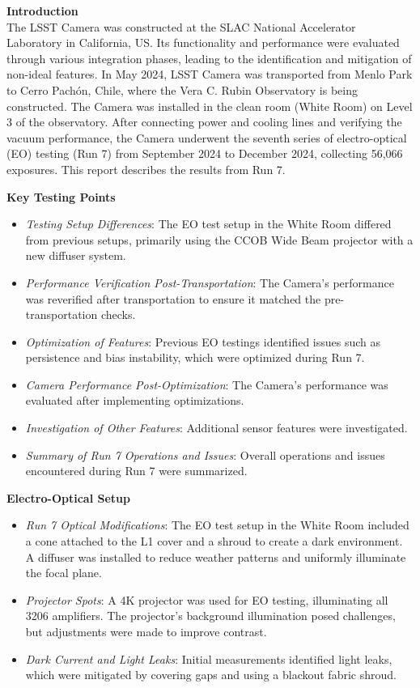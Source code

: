\textbf{Introduction} \\
The LSST Camera was constructed at the SLAC National Accelerator Laboratory in California, US. Its functionality and performance were evaluated through various integration phases, leading to the identification and mitigation of non-ideal features.
In May 2024, LSST Camera was transported from Menlo Park to Cerro Pachón, Chile, where the Vera C. Rubin Observatory is being constructed. The Camera was installed in the clean room (White Room) on Level 3 of the observatory. After connecting power and cooling lines and verifying the vacuum performance, the Camera underwent the seventh series of electro-optical (EO) testing (Run 7) from September 2024 to December 2024, collecting 56,066 exposures. This report describes the results from Run 7.

\textbf{Key Testing Points} \\
\begin{itemize}
    \item \textit{Testing Setup Differences}: The EO test setup in the White Room differed from previous setups, primarily using the CCOB Wide Beam projector with a new diffuser system.
    \item \textit{Performance Verification Post-Transportation}: The Camera's performance was reverified after transportation to ensure it matched the pre-transportation checks.
    \item \textit{Optimization of Features}: Previous EO testings identified issues such as persistence and bias instability, which were optimized during Run 7.
    \item \textit{Camera Performance Post-Optimization}: The Camera's performance was evaluated after implementing optimizations.
    \item \textit{Investigation of Other Features}: Additional sensor features were investigated.
    \item \textit{Summary of Run 7 Operations and Issues}: Overall operations and issues encountered during Run 7 were summarized.
\end{itemize}

\textbf{Electro-Optical Setup} \\
\begin{itemize}
    \item \textit{Run 7 Optical Modifications}: The EO test setup in the White Room included a cone attached to the L1 cover and a shroud to create a dark environment. A diffuser was installed to reduce weather patterns and uniformly illuminate the focal plane.
    \item \textit{Projector Spots}: A 4K projector was used for EO testing, illuminating all 3206 amplifiers. The projector's background illumination posed challenges, but adjustments were made to improve contrast.
    \item \textit{Dark Current and Light Leaks}: Initial measurements identified light leaks, which were mitigated by covering gaps and using a blackout fabric shroud.
\end{itemize}

